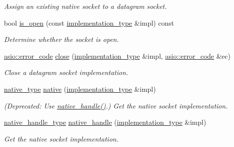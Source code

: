 \begin{DoxyCompactItemize}
\begin{DoxyCompactList}\small\item\em Assign an existing native socket to a datagram socket. \end{DoxyCompactList}\item 
bool \hyperlink{classasio_1_1datagram__socket__service_a3fee9e1dd06d35c771f198a209d96de1}{is\+\_\+open} (const \hyperlink{classasio_1_1datagram__socket__service_a41dcdc6b8a3500d6f88e10b6c08925cd}{implementation\+\_\+type} \&impl) const 
\begin{DoxyCompactList}\small\item\em Determine whether the socket is open. \end{DoxyCompactList}\item 
\hyperlink{classasio_1_1error__code}{asio\+::error\+\_\+code} \hyperlink{classasio_1_1datagram__socket__service_afcac284d855a3425a2d915adade0a549}{close} (\hyperlink{classasio_1_1datagram__socket__service_a41dcdc6b8a3500d6f88e10b6c08925cd}{implementation\+\_\+type} \&impl, \hyperlink{classasio_1_1error__code}{asio\+::error\+\_\+code} \&ec)
\begin{DoxyCompactList}\small\item\em Close a datagram socket implementation. \end{DoxyCompactList}\item 
\hyperlink{classasio_1_1datagram__socket__service_ab82ab07dd8513f35b991a03e3e386e9d}{native\+\_\+type} \hyperlink{classasio_1_1datagram__socket__service_aed6111bbbf9ecce5888b5fdba3b5d42a}{native} (\hyperlink{classasio_1_1datagram__socket__service_a41dcdc6b8a3500d6f88e10b6c08925cd}{implementation\+\_\+type} \&impl)
\begin{DoxyCompactList}\small\item\em (Deprecated\+: Use \hyperlink{classasio_1_1datagram__socket__service_a163ad5675838d2bb037f56cbfd1a0a93}{native\+\_\+handle()}.) Get the native socket implementation. \end{DoxyCompactList}\item 
\hyperlink{classasio_1_1datagram__socket__service_a78991c47ea915a16f6399d64e731ac07}{native\+\_\+handle\+\_\+type} \hyperlink{classasio_1_1datagram__socket__service_a163ad5675838d2bb037f56cbfd1a0a93}{native\+\_\+handle} (\hyperlink{classasio_1_1datagram__socket__service_a41dcdc6b8a3500d6f88e10b6c08925cd}{implementation\+\_\+type} \&impl)
\begin{DoxyCompactList}\small\item\em Get the native socket implementation. \end{DoxyCompactList}\item 

\end{DoxyCompactItemize}
